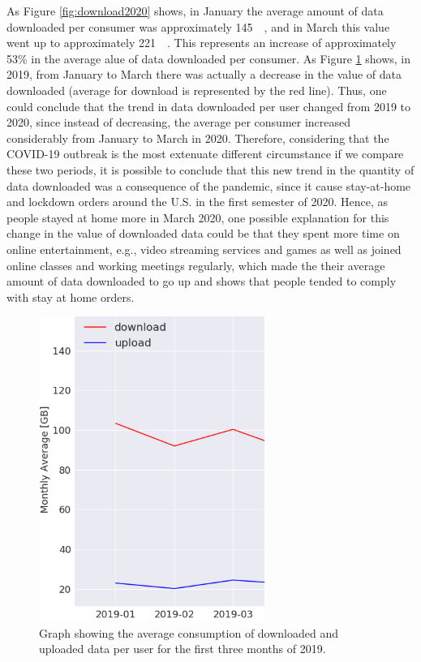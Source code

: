 \documentclass[conference,10pt]{IEEEtran}
\begin{document}
As Figure \ref{fig:download2020} shows, in January the average amount of data downloaded per consumer was approximately \SI{145}{\giga\byte}, and in March this value went up to approximately \SI{221}{\giga\byte}. This represents an increase of approximately 53\% in the average alue of data downloaded per consumer. As Figure \ref{fig:downloadup2019} shows, in 2019, from January to March there was actually a decrease in the value of data downloaded (average for download is represented by the red line). Thus, one could conclude that the trend in data downloaded per user changed from 2019 to 2020, since instead of decreasing, the average per consumer increased considerably from January to March in 2020. Therefore, considering that the COVID-19 outbreak is the most extenuate different circumstance if we compare these two periods, it is possible to conclude that this new trend in the quantity of data downloaded was a consequence of the pandemic, since it cause stay-at-home and lockdown orders around the U.S. in the first semester of 2020. Hence, as people stayed at home more in March 2020, one possible explanation for this change in the value of downloaded data could be that they spent more time on online entertainment, e.g., video streaming services and games as well as joined online classes and working meetings regularly, which made the their average amount of data downloaded to go up and shows that people tended to comply with stay at home orders.

\begin{figure}
\centering
\includegraphics[width=0.5\linewidth]{figs/downloadup2019.PNG}
\caption{Graph showing the average consumption of downloaded and uploaded data per user for the first three months of 2019.}
\label{fig:downloadup2019}
\end{figure}
\end{document}
